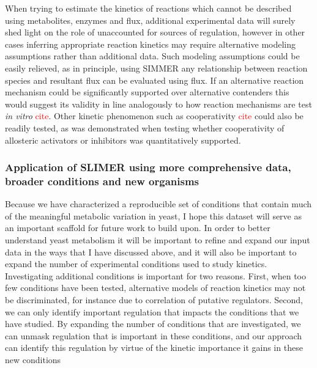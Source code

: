 When trying to estimate the kinetics of reactions which cannot be described using metabolites, enzymes and flux, additional experimental data will surely shed light on the role of unaccounted for sources of regulation, however in other cases inferring appropriate reaction kinetics may require alternative modeling assumptions rather than additional data. Such modeling assumptions could be easily relieved, as in principle, using SIMMER any relationship between reaction species and resultant flux can be evaluated using flux. If an alternative reaction mechanism could be significantly supported over alternative contenders this would suggest its validity in line analogously to how reaction mechanisms are test \textit{in vitro} \textcolor{red}{cite}. Other kinetic phenomenon such as cooperativity \textcolor{red}{cite} could also be readily tested, as was demonstrated when testing whether cooperativity of allosteric activators or inhibitors was quantitatively supported.

\subsubsection{Application of SLIMER using more comprehensive data, broader conditions and new organisms}

Because we have characterized a reproducible set of conditions that contain much of the meaningful metabolic variation in yeast, I hope this dataset will serve as an important scaffold for future work to build upon.  In order to better understand yeast metabolism it will be important to refine and expand our input data in the ways that I have discussed above, and it will also be important to expand the number of experimental conditions used to study kinetics. Investigating additional conditions is important for two reasons. First, when too few conditions have been tested, alternative models of reaction kinetics may not be discriminated, for instance due to correlation of putative regulators. Second, we can only identify important regulation that impacts the conditions that we have studied. By expanding the number of conditions that are investigated, we can unmask regulation that is important in these conditions, and our approach can identify this regulation by virtue of the kinetic importance it gains in these new conditions

